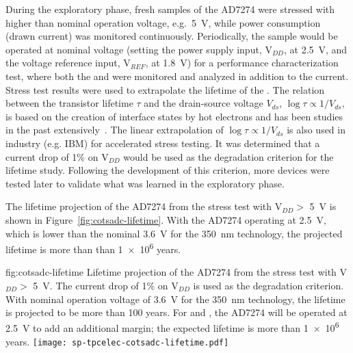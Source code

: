 During the exploratory phase, fresh samples of the   
AD7274 were stressed with higher than nominal operation voltage, e.g.~\SI{5}{V},
while power consumption (drawn current) was monitored continuously. 
Periodically, the sample would be operated at nominal voltage (setting the power
supply input, V$_{DD}$, at \SI{2.5}{V}, and the voltage reference input, 
V$_{REF}$, at \SI{1.8}{V}) for a performance characterization test, where 
both the  and  were monitored and analyzed in addition 
to the current. Stress test results were used to extrapolate the 
lifetime of the  . The relation between the
 transistor lifetime $\tau$ and the drain-source voltage $V_{ds}$, 
$\log\tau\propto1/V_{ds}$, is based on the creation of interface states by hot 
electrons and has been studies in the past extensively~\cite{Li:CELAr}.
The linear extrapolation of $\log\tau\propto1/V_{ds}$ is also used in industry (e.g. IBM) 
for accelerated stress testing. It was determined that a current drop 
of \num{1}\% on V$_{DD}$ would be used as the degradation criterion for the lifetime 
study. Following the development of this criterion, more devices were tested later
to validate what was learned in the exploratory phase.

The lifetime projection of the AD7274  from the stress 
test with V$_{DD} >$ \SI{5}{V} is shown in Figure~\ref{fig:cotsadc-lifetime}. 
With the AD7274 operating at \SI{2.5}{V}, which is lower than the nominal 
\SI{3.6}{V} for the \SI{350}{nm}  technology, the projected lifetime 
is more than than \num{1e6} years.

\begin{dunefigure}
{fig:cotsadc-lifetime}
{Lifetime projection of the   AD7274 from the stress test 
with V$_{DD} >$ \SI{5}{V}. The current drop of 1\% on V$_{DD}$ is used as 
the degradation criterion. With nominal operation voltage of \SI{3.6}{V} for the 
\SI{350}{nm}  technology, the lifetime is projected to be more 
than 100 years. For  and  , the AD7274 will be
operated at \SI{2.5}{V} to add an additional margin; the expected lifetime is more 
than \num{1e6} years.}
\texttt{[image: sp-tpcelec-cotsadc-lifetime.pdf]}
\end{dunefigure}


